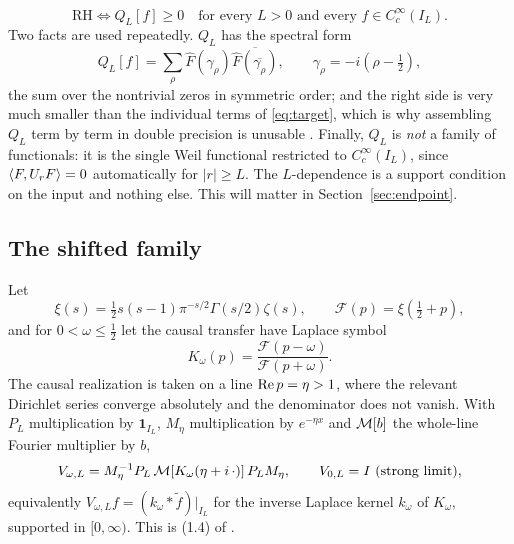 \begin{equation}\label{eq:criterion}
 \mathrm{RH}\iff Q_L[f]\geq0\quad\text{for every }L>0
 \text{ and every }f\in C_c^\infty(I_L).
\end{equation}
Two facts are used repeatedly. $Q_L$ has the spectral form
\begin{equation}\label{eq:spectral-target}
 Q_L[f]=\sum_\rho\widehat F(\gamma_\rho)
 \overline{\widehat F(\overline{\gamma_\rho})},
 \qquad \gamma_\rho=-i(\rho-\tfrac12),
\end{equation}
the sum over the nontrivial zeros in symmetric order; and the right side is
very much smaller than the individual terms of \eqref{eq:target}, which is why
assembling $Q_L$ term by term in double precision is unusable
\cite{InverseBulk,Selection}. Finally, $Q_L$ is \emph{not} a family of
functionals: it is the single Weil functional restricted to $C_c^\infty(I_L)$,
since $\langle F,U_rF\rangle=0$ automatically for $|r|\geq L$. The $L$-dependence is a
support condition on the input and nothing else. This will matter in
Section~\ref{sec:endpoint}.

\subsection{The shifted family}

Let
\begin{equation}\label{eq:xi}
 \xi(s)=\tfrac12s(s-1)\pi^{-s/2}\Gamma(s/2)\zeta(s),\qquad
 \mathcal F(p)=\xi(\tfrac12+p),
\end{equation}
and for $0<\omega\leq\frac12$ let the causal transfer have Laplace symbol
\begin{equation}\label{eq:symbol}
 K_\omega(p)=\frac{\mathcal F(p-\omega)}{\mathcal F(p+\omega)} .
\end{equation}
The causal realization is taken on a line $\operatorname{Re} p=\eta>1$, where the relevant
Dirichlet series converge absolutely and the denominator does not vanish. With
$P_L$ multiplication by $\mathbf1_{I_L}$, $M_\eta$ multiplication by $e^{-\eta x}$
and $\mathcal M[b]$ the whole-line Fourier multiplier by $b$,
\begin{equation}\label{eq:transfer}
 V_{\omega,L}=M_\eta^{-1}P_L\,\mathcal M[K_\omega(\eta+i\,\cdot)]\,P_LM_\eta ,
 \qquad V_{0,L}=I\ \text{(strong limit)} ,
\end{equation}
equivalently $V_{\omega,L}f=(k_\omega*\widetilde f)|_{I_L}$ for the inverse
Laplace kernel $k_\omega$ of $K_\omega$, supported in $[0,\infty)$. This is
(1.4) of \cite{Background}.

